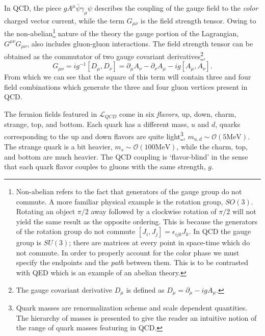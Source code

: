 In QCD, the piece $gA^\mu \bar{\psi} \gamma_\mu \psi$ describes the coupling of the gauge field to the \emph{color} charged vector current, while the term $G_{\mu\nu}$ is the field strength tensor. Owing to the non-abelian\footnote{Non-abelian refers to the fact that generators of the gauge group do not commute. A more familiar physical example is the rotation group, $SO(3)$. Rotating an object $\pi/2$ away followed by a clockwise rotation of $\pi/2$ will not yield the same result as the opposite ordering. This is because the generators of the rotation group do not commute $[J_i,J_j] = \epsilon_{ijk} J_k$. In QCD the gauge group is $SU(3)$; there are matrices at every point in space-time which do not commute. In order to properly account for the color phase we must specify the endpoints and the \emph{path} between them. This is to be contrasted with QED which is an example of an abelian theory.}
 nature of the theory the gauge portion of the Lagrangian, $G^{\mu\nu } G_{\mu\nu}$, also includes gluon-gluon interactions. The field strength tensor can be obtained as the commutator of two gauge covariant derivatives\footnote{The gauge covariant derivative $D_\mu$ is defined as $D_\mu = \partial_\mu - i g A_\mu$.}, 
\begin{equation*}
G_{\mu\nu} = ig^{-1} \left[ D_\mu , D_\nu \right] = \partial_\mu A_\nu - \partial_\nu A_\mu -ig\left[A_\mu, A_\nu\right].
\end{equation*}
From which we can see that the square of this term will contain three and four field combinations which generate the three and four gluon vertices present in QCD. 

The fermion fields featured in $\mathcal{L}_{QCD}$ come in six \emph{flavors}, up, down, charm, strange, top, and bottom. Each quark has a different mass, $u$ and $d$, quarks corresponding to the up and down flavors are quite light\footnote{Quark masses are renormalization scheme and scale dependent quantities. The hierarchy of masses is presented to give the reader an intuitive notion of the range of quark masses featuring in QCD.}, $m_{u,d} \sim \mathcal{O}(5\mathrm{MeV})$. The strange quark is a bit heavier, $m_s \sim \mathcal{O}(100\mathrm{MeV})$, while the charm, top, and bottom are much heavier. The QCD coupling is `flavor-blind' in the sense that each quark flavor couples to gluons with the same  strength, $g$. 

